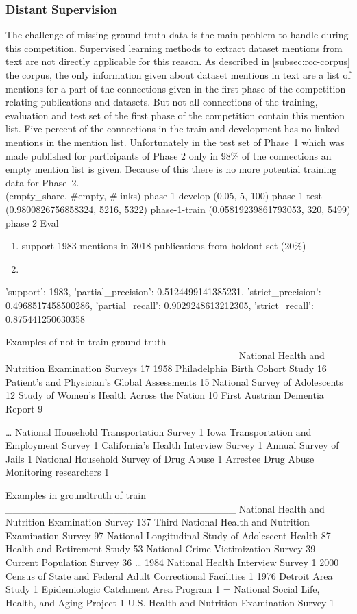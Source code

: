 \subsubsection{Distant Supervision}
The challenge of missing ground truth data is the main problem to handle during this competition. Supervised learning methods to extract dataset mentions from text are not directly applicable for this reason.
As described in \ref{subsec:rcc-corpus} the corpus, the only information given about dataset mentions in text are a list of mentions for a part of the connections given in the first phase of the competition relating publications and datasets.
But not all connections of the training, evaluation and test set of the first phase of the competition contain this mention list.
Five percent of the connections in the train and development has no linked mentions in the mention list.
Unfortunately in the test set of Phase~1 which was made published for participants of Phase 2 only in 98\% of the connections an empty mention list is given.
Because of this there is no more potential training data for Phase~2.\\
                          (empty_share, #empty, #links)
    phase-1-develop                      (0.05, 5, 100)
    phase-1-test       (0.9800826756858324, 5216, 5322)
    phase-1-train      (0.05819239861793053, 320, 5499)
phase 2 Eval
\begin{enumerate}
    \item support 1983 mentions in 3018 publications from holdout set (20\%)
    \item 
\end{enumerate}
{'support': 1983,
 'partial_precision': 0.5124499141385231,
 'strict_precision': 0.4968517458500286,
 'partial_recall': 0.9029248613212305,
 'strict_recall': 0.875441250630358}

Examples of not in train ground truth 
________________________________
National Health and Nutrition Examination Surveys 17
1958 Philadelphia Birth Cohort Study 16
Patient’s and Physician’s Global Assessments 15
National Survey of Adolescents 12
Study of Women’s Health Across the Nation 10
First Austrian Dementia Report 9

\dots
National Household Transportation Survey 1
Iowa Transportation and Employment Survey 1
California’s Health Interview Survey 1
Annual Survey of Jails 1
National Household Survey of Drug Abuse 1
Arrestee Drug Abuse Monitoring researchers 1


Examples in groundtruth of train
________________________________
National Health and Nutrition Examination Survey 137
Third National Health and Nutrition Examination Survey 97
National Longitudinal Study of Adolescent Health 87
Health and Retirement Study 53
National Crime Victimization Survey 39
Current Population Survey 36
\dots
1984 National Health Interview Survey 1
2000 Census of State and Federal Adult Correctional Facilities 1
1976 Detroit Area Study 1
Epidemiologic Catchment Area Program 1
= National Social Life, Health, and Aging Project 1
U.S. Health and Nutrition Examination Survey 1



